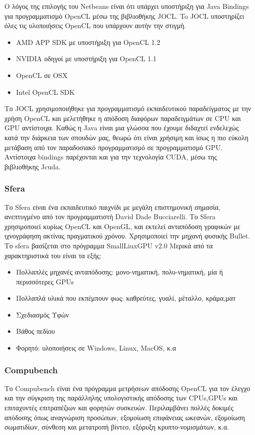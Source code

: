 Ο λόγος της επιλογής του Netbeans είναι ότι υπάρχει υποστήριξη για Java Bindings για προγραμματισμό OpenCL μέσω της βιβλιοθήκης JOCL. To JOCL υποστηρίζει όλες τις υλοποιήσεις OpenCL που υπάρχουν αυτήν την στιγμή.
\begin{itemize}
\item AMD APP SDK με υποστήριξη για OpenCL 1.2
\item NVIDIA οδηγοί με υποστήριξη για OpenCL 1.1
\item OpenCL σε OSX
\item Intel OpenCL SDK
\end{itemize}

Το JOCL χρησιμοποιήθηκε για προγραμματισμό εκπαιδευτικού παραδείγματος με την χρήση OpenCL και μελετήθηκε η απόδοση διαφόρων παραδειγμάτων σε CPU και GPU αντίστοιχα. Καθώς η Java είναι μια γλώσσα που έχουμε διδαχτεί ενδελεχώς κατά την διάρκεια των σπουδών μας, θεωρώ ότι είναι χρήσιμη και ίσως η πιο εύκολη μετάβαση από τον παραδοσιακό προγραμματισμό σε προγραμματισμό GPU.
Αντίστοιχα bindings παρέχονται και για την τεχνολογία CUDA, μέσω της βιβλιοθήκης Jcuda.

\subsubsection{Sfera}
Το Sfera είναι ένα εκπαιδευτικό παιχνίδι με μεγάλη επιστημονική σημασία, ανεπτυγμένο από τον προγραμματιστή David Dade Bucciarelli. Το Sfera χρησιμοποιεί κυρίως OpenCL και OpenGL, και εκτελεί ανταπόδοση γραφικών με ιχνογράφηση ακτίνας πραγματικού χρόνου. Χρησιμοποιεί την μηχανή φυσικής Bullet. Το sfera βασίζεται στο πρόγραμμα SmallLiuxGPU v2.0 Μερικά από τα χαρακτηριστικά του είναι τα εξής:
\begin{itemize}
\item Πολλαπλές μηχανές ανταπόδοσης: μονο-νηματική, πολυ-νηματική, μία ή περισσότερες GPUs
\item Πολλαπλά υλικά που εκπέμπουν φως: καθρεύτες, γυαλί, μέταλλο, κράμα,ματ
\item Σχεδιασμός Υφών
\item Βάθος πεδίου
\item Φορητό: υλοποιήσεις σε Windows, Linux, MacOS, κ.α
\end{itemize}

\subsubsection{Compubench}
Το Compubench είναι ένα πρόγραμμα μετρήσεων απόδοσης OpenCL για τον έλεγχο και την σύγκριση της παράλληλης υπολογιστικής απόδοσης των CPUs,GPUs και επιταχυντές επιτραπέζιων και φορητών συσκευών. Περιλαμβάνει πολλές δοκιμές απόδοσης όπως αναγνώριση προσώπων, εξομοίωση επιφάνειας ωκεανών, εξομοίωση σωματιδίων, σύνθεση και μετατροπή βίντεο, εξόρυξη κρυπτο-νομισμάτων, κ.α.
